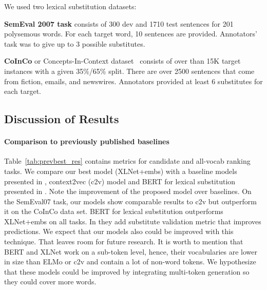 \documentclass[11pt,a4paper]{article}
\begin{document}
We used two lexical substitution datasets:

\textbf{SemEval 2007 task} \cite{mccarthy-navigli-2007-semeval}  consists of 300 dev and 1710 test sentences for 201 polysemous words. For each target word, 10 sentences are provided. Annotators' task was to give up to 3 possible substitutes.
    
\textbf{CoInCo} or Concepts-In-Context dataset~\cite{kremer-etal-2014-substitutes} consists of over than 15K target instances with a given 35\%/65\% split. There are over 2500 sentences that come from fiction, emails, and newswires. Annotators provided at least 6 substitutes for each target.
    


\subsection{Discussion of Results}

\paragraph{Comparison to previously published baselines}

Table~\ref{tab:prevbest_res} contains metrics for candidate and all-vocab ranking tasks. We compare our best model (XLNet+embs) with a baseline models presented in \cite{pic}, context2vec (c2v) model \cite{c2v} and BERT for lexical substitution presented in \cite{zhou-etal-2019-bert}. Note the improvement of the proposed model over baselines. On the SemEval07 task, our models show comparable results to c2v but outperform it on the CoInCo data set. BERT for lexical substitution outperforms XLNet+embs on all tasks. In \cite{zhou-etal-2019-bert} they add substitute validation metric that improves predictions. We expect that our models also could be improved with this technique. That leaves room for future research. It is worth to mention that BERT and XLNet work on a sub-token level, hence, their vocabularies are lower in size than ELMo or c2v and contain a lot of non-word tokens. We hypothesize that these models could be improved by integrating multi-token generation so they could cover more words. 
\end{document}
